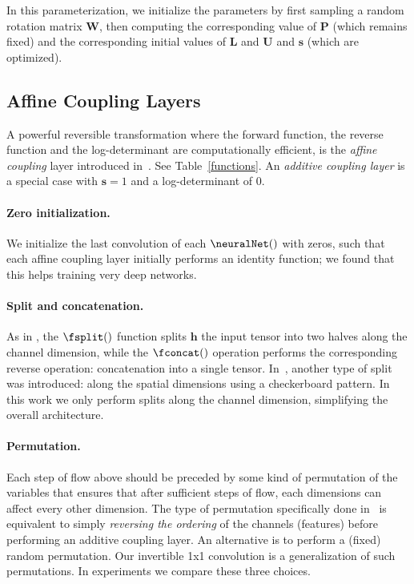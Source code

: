 \documentclass{article}
\newcommand{\bb}[1]{\mathbf{#1}}
\newcommand{\bW}{\bb{W}}
\newcommand{\bh}{\bb{h}}
\newcommand{\bs}{\mathbf{s}}
\begin{document}
In this parameterization, we initialize the parameters by first sampling a random rotation matrix $\bW$, then computing the corresponding value of $\mathbf{P}$ (which remains fixed) and the corresponding initial values of $\mathbf{L}$ and $\mathbf{U}$ and $\bs$ (which are optimized).

\subsection{Affine Coupling Layers}
\label{sec:affine}

A powerful reversible transformation where the forward function, the reverse function and the log-determinant are computationally efficient, is the \emph{affine coupling} layer introduced in~\citep{dinh2014nice,dinh2016density}. See Table~\ref{functions}. An \emph{additive coupling layer} is a special case with $\bs = 1$ and a log-determinant of 0.

\paragraph{Zero initialization.} We initialize the last convolution of each $\neuralNet()$ with zeros, such that each affine coupling layer initially performs an identity function; we found that this helps training very deep networks.

\paragraph{Split and concatenation.} As in \citep{dinh2014nice}, the $\fsplit()$ function splits $\bh$ the input tensor into two halves along the channel dimension, while the $\fconcat()$ operation performs the corresponding reverse operation: concatenation into a single tensor. In~\citep{dinh2016density}, another type of split was introduced: along the spatial dimensions using a checkerboard pattern. In this work we only perform splits along the channel dimension, simplifying the overall architecture.

\paragraph{Permutation.} Each step of flow above should be preceded by some kind of permutation of the variables that ensures that after sufficient steps of flow, each dimensions can affect every other dimension. The type of permutation specifically done in~\citep{dinh2014nice,dinh2016density} is equivalent to simply \emph{reversing the ordering} of the channels (features) before performing an additive coupling layer. An alternative is to perform a (fixed) random permutation. Our invertible 1x1 convolution is a generalization of such permutations. In experiments we compare these three choices.
\end{document}
